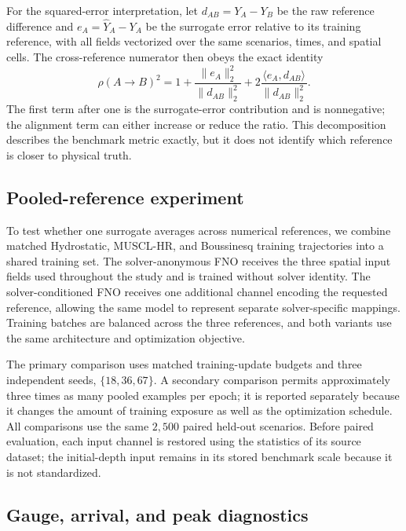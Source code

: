 For the squared-error interpretation, let $d_{AB} = Y_A - Y_B$ be the raw reference difference and $e_A = \widehat{Y}_A - Y_A$ be the surrogate error relative to its training reference, with all fields vectorized over the same scenarios, times, and spatial cells. The cross-reference numerator then obeys the exact identity
\begin{equation}
\rho(A \rightarrow B)^2
= 1 + \frac{\lVert e_A \rVert_2 ^ 2}{\lVert d_{AB} \rVert_2 ^ 2}
+ 2\frac{\langle e_A,d_{AB}\rangle}{\lVert d_{AB} \rVert_2 ^ 2}.
\end{equation}
The first term after one is the surrogate-error contribution and is nonnegative; the alignment term can either increase or reduce the ratio. This decomposition describes the benchmark metric exactly, but it does not identify which reference is closer to physical truth.

\subsection{Pooled-reference experiment}
\label{subsec:pooled-reference}
To test whether one surrogate averages across numerical references, we combine matched Hydrostatic, MUSCL-HR, and Boussinesq training trajectories into a shared training set. The solver-anonymous FNO receives the three spatial input fields used throughout the study and is trained without solver identity. The solver-conditioned FNO receives one additional channel encoding the requested reference, allowing the same model to represent separate solver-specific mappings. Training batches are balanced across the three references, and both variants use the same architecture and optimization objective.

The primary comparison uses matched training-update budgets and three independent seeds, $\{18, 36, 67\}$. A secondary comparison permits approximately three times as many pooled examples per epoch; it is reported separately because it changes the amount of training exposure as well as the optimization schedule. All comparisons use the same $2{,}500$ paired held-out scenarios. Before paired evaluation, each input channel is restored using the statistics of its source dataset; the initial-depth input remains in its stored benchmark scale because it is not standardized.

\subsection{Gauge, arrival, and peak diagnostics}
\label{subsec:wave-metrics}

